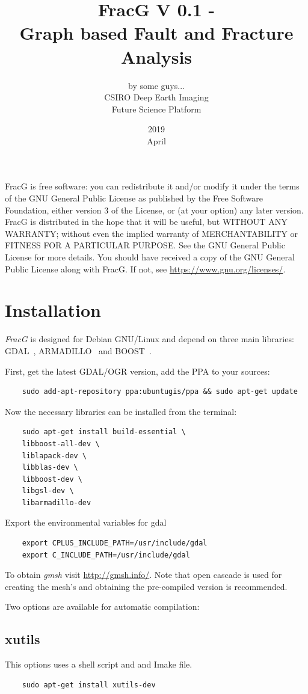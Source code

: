 \documentclass[10pt,a4paper]{article}
\title{\textbf{FracG V 0.1} - \\
Graph based Fault and Fracture Analysis}
\date{2019\\ April}
\author{by some guys...  \\
{\small CSIRO Deep Earth Imaging }\\
{\small Future Science Platform}}
\begin{document}
\maketitle
\newpage
\tableofcontents
\vspace*{\fill}
FracG is free software: you can redistribute it and/or modify
it under the terms of the GNU General Public License as published by
the Free Software Foundation, either version 3 of the License, or
(at your option) any later version.
FracG is distributed in the hope that it will be useful,
but WITHOUT ANY WARRANTY; without even the implied warranty of
MERCHANTABILITY or FITNESS FOR A PARTICULAR PURPOSE.  
See the GNU General Public License for more details.
You should have received a copy of the GNU General Public License along with FracG.  
If not, see \url{https://www.gnu.org/licenses/}.

\newpage
\section{Installation}
\textit{FracG} is designed for Debian GNU/Linux and depend on three main libraries: GDAL~\cite{gdal18}, ARMADILLO~\cite{san16} and BOOST~\cite{sie02, geh16}.

First, get the latest GDAL/OGR version, add the PPA to your sources:
\begin{verbatim}
	sudo add-apt-repository ppa:ubuntugis/ppa && sudo apt-get update
\end{verbatim}

Now the necessary libraries can be installed from the terminal:
\begin{verbatim}	
	sudo apt-get install build-essential \
	libboost-all-dev \
	liblapack-dev \
	libblas-dev \ 
	libboost-dev \
	libgsl-dev \
	libarmadillo-dev 
\end{verbatim}

Export the environmental variables for gdal 
\begin{verbatim}	
	export CPLUS_INCLUDE_PATH=/usr/include/gdal
	export C_INCLUDE_PATH=/usr/include/gdal
\end{verbatim}

To obtain \textit{gmsh} visit \url{http://gmsh.info/}. Note that open cascade is used for creating the mesh's and obtaining the pre-compiled version is recommended.

Two options are available for automatic compilation:

\subsection{xutils}
This options uses a shell script and and Imake file.
\begin{verbatim}
	sudo apt-get install xutils-dev 
\end{verbatim}
\end{document}
